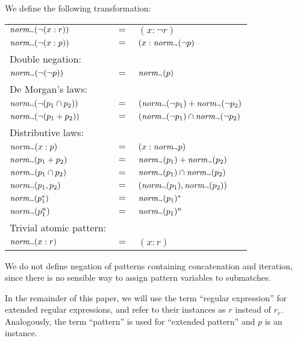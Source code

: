 \needspace{6cm}
\begin{defn}
   \label{defn-negnorm}
   We define the following transformation:

   \begin{tabular}{lll}
      $\mathit{norm_\neg}(\neg(x : r))$		& $=$	& $(x : \neg r)$					\\
      $\mathit{norm_\neg}(\neg(x : p))$		& $=$	& $(x : \mathit{norm_\neg}(\neg p)$				\\
      Double negation:			&	&							\\
      $\mathit{norm_\neg}(\neg(\neg p))$		& $=$	& $\mathit{norm_\neg}(p)$						\\
      De Morgan's laws:			&	&							\\
      $\mathit{norm_\neg}(\neg(p_1 \cap p_2))$	& $=$	& $(\mathit{norm_\neg}(\neg p_1) + \mathit{norm_\neg}(\neg p_2)$		\\
      $\mathit{norm_\neg}(\neg(p_1 + p_2))$	& $=$	& $(\mathit{norm_\neg}(\neg p_1) \cap \mathit{norm_\neg}(\neg p_2)$		\\
      Distributive laws:		&	&							\\
      $\mathit{norm_\neg}(x : p)$			& $=$	& $(x : \mathit{norm_\neg} p)$					\\
      $\mathit{norm_\neg}(p_1 + p_2)$		& $=$	& $\mathit{norm_\neg}(p_1) + \mathit{norm_\neg}(p_2)$			\\
      $\mathit{norm_\neg}(p_1 \cap p_2)$		& $=$	& $\mathit{norm_\neg}(p_1) \cap \mathit{norm_\neg}(p_2)$			\\
      $\mathit{norm_\neg}(p_1, p_2)$		& $=$	& $(\mathit{norm_\neg}(p_1), \mathit{norm_\neg}(p_2))$			\\
      $\mathit{norm_\neg}(p_1^*)$			& $=$	& $\mathit{norm_\neg}(p_1)^*$					\\
      $\mathit{norm_\neg}(p_1^n)$			& $=$	& $\mathit{norm_\neg}(p_1)^n$					\\
      Trivial atomic pattern:		&	&							\\
      $\mathit{norm_\neg}(x : r)$			& $=$	& $(x : r)$						\\
   \end{tabular}
\end{defn}

We do not define negation of patterns containing concatenation and iteration,
since there is no sensible way to assign pattern variables to submatches.

In the remainder of this paper, we will use the term ``regular expression''
for extended regular expressions, and refer to their instances as $r$ instead
of $r_e$.  Analogously, the term ``pattern'' is used for ``extended pattern''
and $p$ is an instance.


